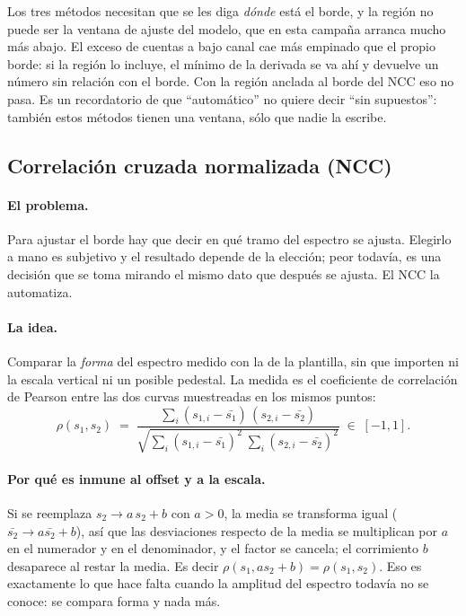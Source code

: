 \documentclass[11pt,a4paper]{article}
\begin{document}
\begin{aviso}
Los tres métodos necesitan que se les diga \emph{dónde} está el borde, y la
región no puede ser la ventana de ajuste del modelo, que en esta campaña
arranca mucho más abajo. El exceso de cuentas a bajo canal cae más
empinado que el propio borde: si la región lo incluye, el mínimo de la
derivada se va ahí y devuelve un número sin relación con el borde. Con la
región anclada al borde del NCC eso no pasa. Es un recordatorio de que
``automático'' no quiere decir ``sin supuestos'': también estos métodos
tienen una ventana, sólo que nadie la escribe.
\end{aviso}

\subsection{Correlación cruzada normalizada (NCC)}
\label{sec:ncc}

\paragraph{El problema.} Para ajustar el borde hay que decir en qué tramo del
espectro se ajusta. Elegirlo a mano es subjetivo y el resultado depende de la
elección; peor todavía, es una decisión que se toma mirando el mismo dato que
después se ajusta. El NCC la automatiza.

\paragraph{La idea.} Comparar la \emph{forma} del espectro medido con la de la
plantilla, sin que importen ni la escala vertical ni un posible pedestal. La
medida es el coeficiente de correlación de Pearson entre las dos curvas
muestreadas en los mismos puntos:
\[
   \rho(s_1, s_2) \;=\;
   \frac{\sum_i (s_{1,i}-\bar{s_1})\,(s_{2,i}-\bar{s_2})}
        {\sqrt{\sum_i (s_{1,i}-\bar{s_1})^2 \;\sum_i (s_{2,i}-\bar{s_2})^2}}
   \;\in\; [-1, 1].
\]

\paragraph{Por qué es inmune al offset y a la escala.} Si se reemplaza
$s_2 \to a\,s_2 + b$ con $a>0$, la media se transforma igual
($\bar{s_2} \to a\bar{s_2}+b$), así que las desviaciones respecto de la media
se multiplican por $a$ en el numerador y en el denominador, y el factor se
cancela; el corrimiento $b$ desaparece al restar la media. Es decir
$\rho(s_1, a s_2 + b) = \rho(s_1, s_2)$. Eso es exactamente lo que hace falta
cuando la amplitud del espectro todavía no se conoce: se compara forma y nada
más.
\end{document}
